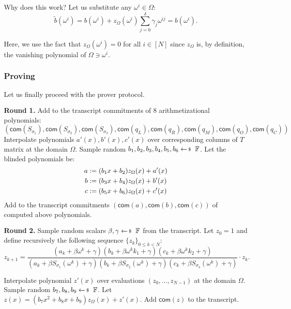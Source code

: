\documentclass[../../book.tex]{subfiles}
\begin{document}
Why does this work? Let us substitute any $\omega^i \in \Omega$:
\begin{equation*}
    \widetilde{b}(\omega^i) = b(\omega^i) + z_{\Omega}(\omega^i)\sum_{j=0}^{\delta}\gamma_j\omega^{ij} = b(\omega^i).
\end{equation*}

Here, we use the fact that $z_{\Omega}(\omega^i) = 0$ for all $i \in [N]$ since $z_{\Omega}$ is, 
by definition, the vanishing polynomial of $\Omega \ni \omega^i$.

\subsubsection{Proving}
Let us finally proceed with the prover protocol.

\textcolor{green!60!black}{\textbf{Round 1.}} Add to the transcript commitments
of 8 arithmetizational polynomials:
\begin{equation*}
    (\mathsf{com}(S_{\sigma_1}), \mathsf{com}(S_{\sigma_2}), \mathsf{com}(S_{\sigma_3}), \mathsf{com}(q_L), \mathsf{com}(q_R), \mathsf{com}(q_M), \mathsf{com}(q_O), \mathsf{com}(q_C))
\end{equation*}
Interpolate polynomials $a'(x), b'(x), c'(x)$ over corresponding columns of $T$ matrix at
the domain $\Omega$. Sample random $b_1, b_2, b_3, b_4, b_5, b_6 \leftarrowS
\mathbb{F}$. Let the blinded polynomials be:
\begin{align*}
\centering
a &:= (b_1 x + b_2)z_{\Omega}(x) + a'(x) \\
b &:= (b_3 x + b_4)z_{\Omega}(x) + b'(x) \\
c &:= (b_5 x + b_6)z_{\Omega}(x) + c'(x)
\end{align*}
Add to the transcript commitments $(\mathsf{com}(a), \mathsf{com}(b),
\mathsf{com}(c))$ of computed above polynomials.

\textcolor{green!60!black}{\textbf{Round 2.}}  Sample random scalars $\beta,
\gamma \leftarrowS \mathbb{F}$ from the transcript. Let $z_0 = 1$ and define
recursively the following sequence $\{z_k\}_{0 \leq k < N}$:
\begin{equation*}
    z_{k+1} = \frac{(a_k + \beta \omega^{k} + \gamma) (b_k + \beta \omega^{k}k_1 + \gamma) (c_k + \beta \omega^{k}k_2 + \gamma)}{(a_k + \beta S_{\sigma_1}(\omega^{k}) + \gamma) (b_k + \beta S_{\sigma_2}(\omega^{k}) + \gamma) (c_k + \beta S_{\sigma_3}(\omega^{k}) + \gamma)} \cdot z_k.
\end{equation*}

Interpolate polynomial $z'(x)$ over evaluations $(z_0, \dots, z_{N-1})$ at the
domain $\Omega$. Sample random $b_7, b_8, b_9 \leftarrowS \mathbb{F}$. Let $z(x)
= (b_7 x^2 + b_8 x + b_9)z_{\Omega}(x) + z'(x)$. Add $\mathsf{com}(z)$ to the transcript.
\end{document}
